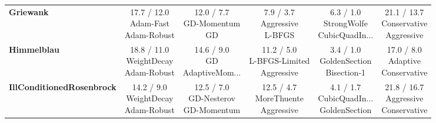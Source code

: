 \documentclass{article}
\begin{document}
\begin{longtable}{lccccc}
\textbf{Griewank} &  \makecell{17.7 / 12.0 \\ \scriptsize{Adam-Fast} \\ \scriptsize{Adam-Robust}}&  \makecell{12.0 / 7.7 \\ \scriptsize{GD-Momentum} \\ \scriptsize{GD}}&  \makecell{7.9 / 3.7 \\ \scriptsize{Aggressive} \\ \scriptsize{L-BFGS}}& \cellcolor{green!20} \makecell{6.3 / 1.0 \\ \scriptsize{StrongWolfe} \\ \scriptsize{CubicQuadIn...}}& \cellcolor{red!15} \makecell{21.1 / 13.7 \\ \scriptsize{Conservative} \\ \scriptsize{Aggressive}} \\
\textbf{Himmelblau} & \cellcolor{red!15} \makecell{18.8 / 11.0 \\ \scriptsize{WeightDecay} \\ \scriptsize{Adam-Robust}}&  \makecell{14.6 / 9.0 \\ \scriptsize{GD} \\ \scriptsize{AdaptiveMom...}}&  \makecell{11.2 / 5.0 \\ \scriptsize{L-BFGS-Limited} \\ \scriptsize{Aggressive}}& \cellcolor{green!20} \makecell{3.4 / 1.0 \\ \scriptsize{GoldenSection} \\ \scriptsize{Bisection-1}}&  \makecell{17.0 / 8.0 \\ \scriptsize{Adaptive} \\ \scriptsize{Conservative}} \\
\textbf{IllConditionedRosenbrock} &  \makecell{14.2 / 9.0 \\ \scriptsize{WeightDecay} \\ \scriptsize{Adam-Robust}}&  \makecell{12.5 / 7.0 \\ \scriptsize{GD-Nesterov} \\ \scriptsize{GD-Momentum}}&  \makecell{12.5 / 4.7 \\ \scriptsize{MoreThuente} \\ \scriptsize{Aggressive}}& \cellcolor{green!20} \makecell{4.1 / 1.7 \\ \scriptsize{CubicQuadIn...} \\ \scriptsize{GoldenSection}}& \cellcolor{red!15} \makecell{21.8 / 16.7 \\ \scriptsize{Aggressive} \\ \scriptsize{Conservative}} \\

\end{longtable}
\end{document}
